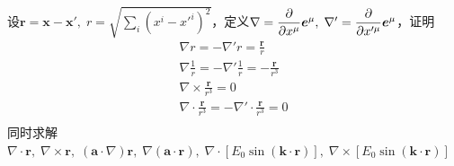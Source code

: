 \documentclass{mynote}
\begin{document}
\begin{exercise}{1.3}
    设$\bm{r} = \bm{x} - \bm{x}',\; r = \sqrt{\sum_{i} (x^{i} - x'^{i})^2} $，定义$\nabla = \dfrac{\partial }{\partial x^{\mu}} \boldsymbol{e}^{\mu},\; \nabla ' = \dfrac{\partial }{\partial x'^{\mu}} \boldsymbol{e}^{\mu}$，证明
    \begin{gather*}
        \nabla r = -\nabla ' r = \frac{\bm{r}}{r} \\
        \nabla \frac{1}{r} = -\nabla' \frac{1}{r} = -\frac{\bm{r}}{r^3} \\
        \nabla \times \frac{\bm{r}}{r^3} = 0 \\
        \nabla \cdot \frac{\bm{r}}{r^3} = - \nabla' \cdot \frac{\bm{r}}{r^3} = 0 \\
    \end{gather*}
    同时求解$\nabla \cdot \bm{r},\; \nabla \times \bm{r},\; (\bm{a}\cdot \nabla)\bm{r},\; \nabla(\bm{a}\cdot \bm{r}),\; \nabla \cdot [E_0 \sin (\bm{k} \cdot \bm{r})],\; \nabla \times [E_0 \sin (\bm{k} \cdot \bm{r})]$
\end{exercise}
\end{document}
